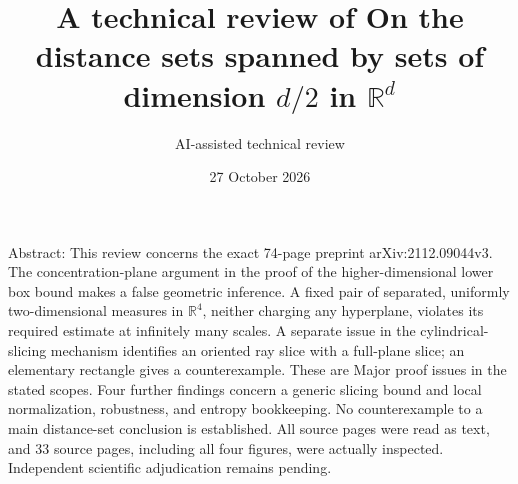 \documentclass[10pt]{article}
\title{A technical review of
On the distance sets spanned by sets
of dimension \(d/2\) in \(\mathbb R^d\)}
\author{AI-assisted technical review}
\date{27 October 2026}
\begin{document}
\maketitle
Abstract: This review concerns the exact 74-page preprint arXiv:2112.09044v3. The concentration-plane argument in the proof of the higher-dimensional lower box bound makes a false geometric inference. A fixed pair of separated, uniformly two-dimensional measures in \(\mathbb R^4\), neither charging any hyperplane, violates its required estimate at infinitely many scales. A separate issue in the cylindrical-slicing mechanism identifies an oriented ray slice with a full-plane slice; an elementary rectangle gives a counterexample. These are Major proof issues in the stated scopes. Four further findings concern a generic slicing bound and local normalization, robustness, and entropy bookkeeping. No counterexample to a main distance-set conclusion is established. All source pages were read as text, and 33 source pages, including all four figures, were actually inspected. Independent scientific adjudication remains pending.\par
\end{document}
